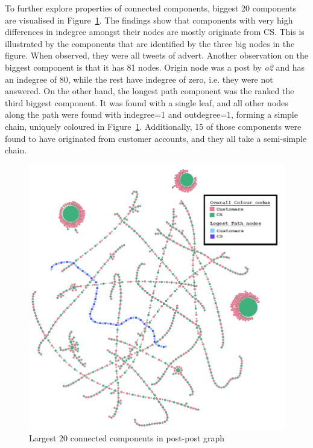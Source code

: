 \documentclass[sigconf]{acmart}
\begin{document}
To further explore properties of connected components, biggest 20
components are visualised in Figure~\ref{fig:20ccpostpostgraph}. The
findings show that components with very high differences in indegree
amongst their nodes are mostly originate from CS. This is illustrated
by the components that are identified by the three big nodes in the
figure. When observed, they were all tweets of advert. Another
observation on the biggest component is that it has 81 nodes. Origin
node was a post by {\emph{o2}} and has an indegree of 80, while the
rest have indegree of zero, i.e. they were not answered. On the other
hand, the longest path component was the ranked the third biggest
component. It was found with a single leaf, and all other nodes along
the path were found with indegree=1 and outdegree=1, forming a simple
chain, uniquely coloured in
Figure~\ref{fig:20ccpostpostgraph}. Additionally, 15 of those
components were found to have originated from customer accounts, and
they all take a semi-simple chain.

\begin{figure}[htb]
\centering
\includegraphics[width=\columnwidth]{images/20ccpostpostgraph.png}
\caption{Largest 20 connected components in post-post graph}
\label{fig:20ccpostpostgraph}
\end{figure}
\end{document}
